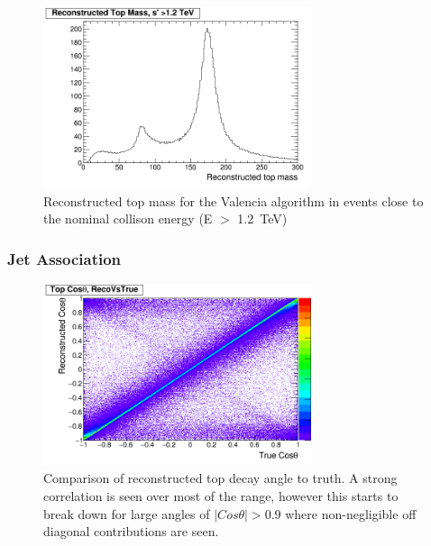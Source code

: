 \begin{figure}
  \centering
  \includegraphics[width=0.7\textwidth]{TopAnalysis/figures/TopMass_EOver1200.png}
  \caption[Performance of Valencia algorithm for high energy events]{Reconstructed top mass for the Valencia algorithm in events close to the nominal collison energy (E $>$ 1.2~TeV)}
  \label{fig:highEValencia}
\end{figure}


\subsubsection{Jet Association}

\begin{figure}
  \centering
  \includegraphics[width=0.7\textwidth]{TopAnalysis/figures/CosThetaRecoVsMC.png}
  \caption[Comparison of reconstructed top decay angle to truth]{Comparison of reconstructed top decay angle to truth. A strong correlation is seen over most of the range, however this starts to break down for large angles of $\mid Cos\theta \mid>0.9$ where non-negligible off diagonal contributions are seen.}
  \label{fig:2djetangle}
\end{figure}

